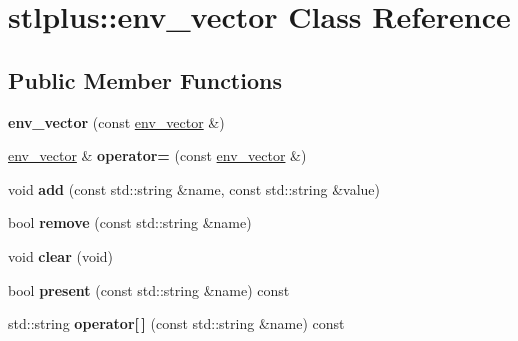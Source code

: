 \hypertarget{classstlplus_1_1env__vector}{}\section{stlplus\+:\+:env\+\_\+vector Class Reference}
\label{classstlplus_1_1env__vector}
\subsection*{Public Member Functions}
\begin{DoxyCompactItemize}
\item 
{\bfseries env\+\_\+vector} (const \hyperlink{classstlplus_1_1env__vector}{env\+\_\+vector} \&)\hypertarget{classstlplus_1_1env__vector_abea99480cbc13dce6f1dce74280c29c6}{}\label{classstlplus_1_1env__vector_abea99480cbc13dce6f1dce74280c29c6}

\item 
\hyperlink{classstlplus_1_1env__vector}{env\+\_\+vector} \& {\bfseries operator=} (const \hyperlink{classstlplus_1_1env__vector}{env\+\_\+vector} \&)\hypertarget{classstlplus_1_1env__vector_a8b7d6aeb961d7aa9e6266097bf1a725a}{}\label{classstlplus_1_1env__vector_a8b7d6aeb961d7aa9e6266097bf1a725a}

\item 
void {\bfseries add} (const std\+::string \&name, const std\+::string \&value)\hypertarget{classstlplus_1_1env__vector_af10595bbdb3c8772f7858d5050ee72e4}{}\label{classstlplus_1_1env__vector_af10595bbdb3c8772f7858d5050ee72e4}

\item 
bool {\bfseries remove} (const std\+::string \&name)\hypertarget{classstlplus_1_1env__vector_a4839a79ac7411212fa5bfd6852aebadb}{}\label{classstlplus_1_1env__vector_a4839a79ac7411212fa5bfd6852aebadb}

\item 
void {\bfseries clear} (void)\hypertarget{classstlplus_1_1env__vector_aaf9b95009941664b50d2775f87cf9a9f}{}\label{classstlplus_1_1env__vector_aaf9b95009941664b50d2775f87cf9a9f}

\item 
bool {\bfseries present} (const std\+::string \&name) const \hypertarget{classstlplus_1_1env__vector_a7eb0b34cbea4bbc47522efb658681e4f}{}\label{classstlplus_1_1env__vector_a7eb0b34cbea4bbc47522efb658681e4f}

\item 
std\+::string {\bfseries operator\mbox{[}$\,$\mbox{]}} (const std\+::string \&name) const \hypertarget{classstlplus_1_1env__vector_a72963fb81503d865007b4e0dd8ff4310}{}\label{classstlplus_1_1env__vector_a72963fb81503d865007b4e0dd8ff4310}


\end{DoxyCompactItemize}
